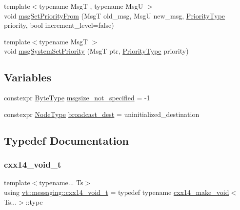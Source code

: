 \begin{DoxyCompactItemize}
\item 
{\footnotesize template$<$typename MsgT , typename MsgU $>$ }\\void \hyperlink{namespacevt_1_1messaging_a9cbb4989b799eaba6ab9b8dde9e3cf14}{msg\+Set\+Priority\+From} (MsgT old\+\_\+msg, MsgU new\+\_\+msg, \hyperlink{namespacevt_a86bff9f556eb761b27fc8600d006ac04}{Priority\+Type} priority, bool increment\+\_\+level=false)
\item 
{\footnotesize template$<$typename MsgT $>$ }\\void \hyperlink{namespacevt_1_1messaging_ab609ea1ed68952c30bc8f9bba8d796b2}{msg\+System\+Set\+Priority} (MsgT ptr, \hyperlink{namespacevt_a86bff9f556eb761b27fc8600d006ac04}{Priority\+Type} priority)
\end{DoxyCompactItemize}
\subsection*{Variables}
\begin{DoxyCompactItemize}
\item 
constexpr \hyperlink{namespacevt_aab8d55968084610ce3b17057981e9300}{Byte\+Type} \hyperlink{namespacevt_1_1messaging_adefd943a6421b1b7120526f969bee20f}{msgsize\+\_\+not\+\_\+specified} = -\/1
\item 
constexpr \hyperlink{namespacevt_a866da9d0efc19c0a1ce79e9e492f47e2}{Node\+Type} \hyperlink{namespacevt_1_1messaging_a11d2b356f56486f2e60f0255cb6b05ff}{broadcast\+\_\+dest} = uninitialized\+\_\+destination
\end{DoxyCompactItemize}


\subsection{Typedef Documentation}
\mbox{\label{namespacevt_1_1messaging_a9724e719b301289eb8b3afbf9c44cf46}} 
\subsubsection{\texorpdfstring{cxx14\+\_\+void\+\_\+t}{cxx14\_void\_t}}
{\footnotesize\ttfamily template$<$typename... Ts$>$ \\
using \hyperlink{namespacevt_1_1messaging_a9724e719b301289eb8b3afbf9c44cf46}{vt\+::messaging\+::cxx14\+\_\+void\+\_\+t} = typedef typename \hyperlink{structvt_1_1messaging_1_1cxx14__make__void}{cxx14\+\_\+make\+\_\+void}$<$Ts...$>$\+::type}


